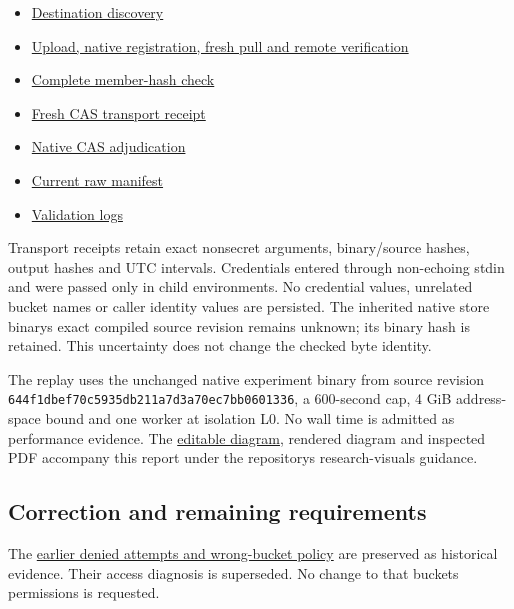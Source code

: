 \documentclass[
  10pt,
]{article}
\providecommand{\tightlist}{%
  \setlength{\itemsep}{0pt}\setlength{\parskip}{0pt}}
\begin{document}
\begin{itemize}
\tightlist
\item
  \href{../../execution-v2/publication-20261025-destination-discovery-v2/RECEIPT.json}{Destination
  discovery}
\item
  \href{../../execution-v2/publication-20261025-setec-v1/RECEIPT.json}{Upload,
  native registration, fresh pull and remote verification}
\item
  \href{../../execution-v2/publication-20261025-setec-v1/ARCHIVE_CHECK.json}{Complete
  member-hash check}
\item
  \href{../../execution-v2/publication-20261025-setec-replay/gp.json}{Fresh
  CAS transport receipt}
\item
  \href{../../execution-v2/publication-20261025-setec-replay/adjudication/ADJUDICATION.json}{Native
  CAS adjudication}
\item
  \href{../../execution-v2/RAW_ARTIFACTS.json}{Current raw manifest}
\item
  \href{../../execution-v2/publication-20261025-setec-checks/}{Validation
  logs}
\end{itemize}

Transport receipts retain exact nonsecret arguments, binary/source
hashes, output hashes and UTC intervals. Credentials entered through
non-echoing stdin and were passed only in child environments. No
credential values, unrelated bucket names or caller identity values are
persisted. The inherited native store binary\textquotesingle s exact
compiled source revision remains unknown; its binary hash is retained.
This uncertainty does not change the checked byte identity.

The replay uses the unchanged native experiment binary from source
revision \texttt{644f1dbef70c5935db211a7d3a70ec7bb0601336}, a 600-second
cap, 4 GiB address-space bound and one worker at isolation L0. No wall
time is admitted as performance evidence. The
\href{DIAGRAM.dot}{editable diagram}, rendered diagram and inspected PDF
accompany this report under the repository\textquotesingle s
research-visuals guidance.

\subsection{Correction and remaining
requirements}\label{correction-and-remaining-requirements}

The \href{../publication-20261025/REPORT.md}{earlier denied attempts and
wrong-bucket policy} are preserved as historical evidence. Their access
diagnosis is superseded. No change to that bucket\textquotesingle s
permissions is requested.
\end{document}
